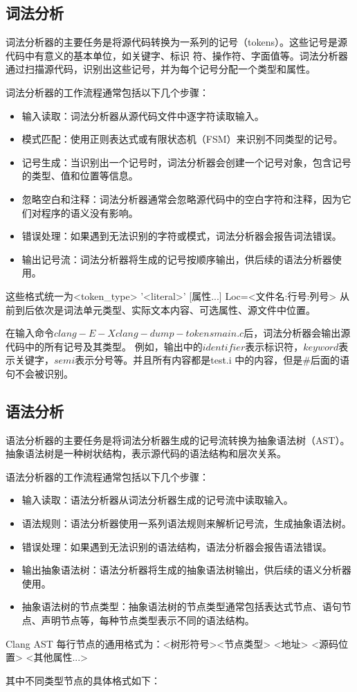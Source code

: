 \documentclass[UTF8,a4paper,10pt]{ctexart}
\begin{document}
\subsection{词法分析}
词法分析器的主要任务是将源代码转换为一系列的记号（tokens）。这些记号是源代码中有意义的基本单位，如关键字、标识
符、操作符、字面值等。词法分析器通过扫描源代码，识别出这些记号，并为每个记号分配一个类型和属性。
\par
词法分析器的工作流程通常包括以下几个步骤：
\begin{itemize}
  \item 输入读取：词法分析器从源代码文件中逐字符读取输入。
  \item 模式匹配：使用正则表达式或有限状态机（FSM）来识别不同类型的记号。
  \item 记号生成：当识别出一个记号时，词法分析器会创建一个记号对象，包含记号的类型、值和位置等信息。
  \item 忽略空白和注释：词法分析器通常会忽略源代码中的空白字符和注释，因为它们对程序的语义没有影响。
  \item 错误处理：如果遇到无法识别的字符或模式，词法分析器会报告词法错误。       
  \item 输出记号流：词法分析器将生成的记号按顺序输出，供后续的语法分析器使用。
\end{itemize}
\par
这些格式统一为<token\_type> '<literal>'  [属性...]  Loc=<文件名:行号:列号>
从前到后依次是词法单元类型、实际文本内容、可选属性、源文件中位置。
\par
在输入命令$clang -E -Xclang -dump-tokens main.c$后，词法分析器会输出源代码中的所有记号及其类型。
例如，输出中的$identifier$表示标识符，$keyword$表示关键字，$semi$表示分号等。并且所有内容都是test.i
中的内容，但是\#后面的语句不会被识别。
\subsection{语法分析}   
语法分析器的主要任务是将词法分析器生成的记号流转换为抽象语法树（AST）。抽象语法树是一种树状结构，表示源代码的语法结构和层次关系。 
\par
语法分析器的工作流程通常包括以下几个步骤：
\begin{itemize}
  \item 输入读取：语法分析器从词法分析器生成的记号流中读取输入。
  \item 语法规则：语法分析器使用一系列语法规则来解析记号流，生成抽象语法树。
  \item 错误处理：如果遇到无法识别的语法结构，语法分析器会报告语法错误。
  \item 输出抽象语法树：语法分析器将生成的抽象语法树输出，供后续的语义分析器使用。
  \item 抽象语法树的节点类型：抽象语法树的节点类型通常包括表达式节点、语句节点、声明节点等，每种节点类型表示不同的语法结构。
\end{itemize}
\par
Clang AST 每行节点的通用格式为：<树形符号><节点类型> <地址> <源码位置> <其他属性...>\par
其中不同类型节点的具体格式如下：
\end{document}
